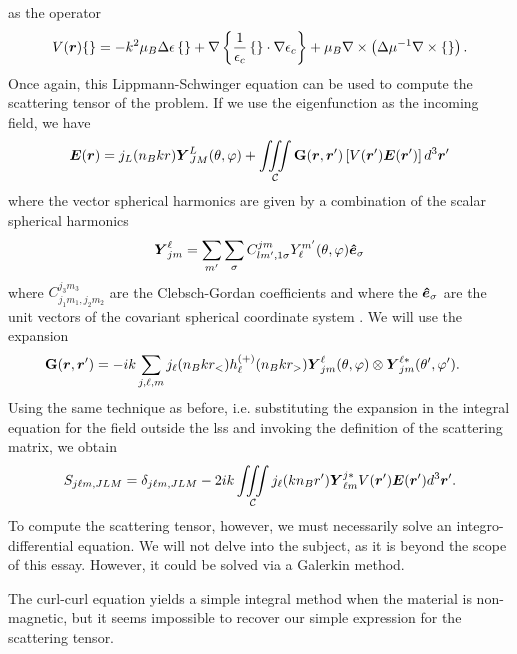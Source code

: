 as the operator
	\begin{equation}
		V(\boldsymbol{r})\{\} = -k^2\mu_B\Delta\epsilon\left\{\right\}
					+\nabla\left\{\frac{1}{\epsilon_c}\left\{\right\}\cdot\nabla\epsilon_c\right\}
					+\mu_B\nabla\times\left(\Delta\mu^{-1}\nabla\times\left\{\right\}\right).
	\end{equation}
Once again, this Lippmann-Schwinger equation can be used to compute the scattering tensor
of the problem. If we use the eigenfunction as the incoming field, we have
	\begin{equation}
		\boldsymbol{E}(\boldsymbol{r}) = j_L(n_Bkr)\boldsymbol{Y}^L_{JM}(\theta,\varphi)
						+\mathop{\iiint}_\mathcal{C}\mathbf{G}(\boldsymbol{r},\boldsymbol{r}')\left[V(\boldsymbol{r}')\boldsymbol{E}(\boldsymbol{r}')\right]d^3\boldsymbol{r}'
	\end{equation}
where the vector spherical harmonics are given by a combination of the
scalar spherical harmonics
	\begin{equation}
		\boldsymbol{Y}^\ell_{jm} = \sum_{m'}\sum_{\sigma}C^{jm}_{lm',1\sigma}Y_\ell^{m'}(\theta,\varphi)\boldsymbol{\hat{e}}_\sigma
	\end{equation}
where $C^{j_3m_3}_{j_1m_1,j_2m_2}$ are the Clebsch-Gordan coefficients and where
the $\boldsymbol{\hat{e}}_\sigma$ are the unit vectors of the covariant spherical coordinate system \cite{VAR1988}.
We will use the expansion
	\begin{align}
		\mathbf{G}(\boldsymbol{r},\boldsymbol{r}')	&= -ik\sum_{j,\ell,m} j_\ell(n_Bkr_<)h^{(+)}_\ell(n_Bkr_>)
													\boldsymbol{Y}^{\ell}_{jm}(\theta,\varphi)\otimes\boldsymbol{Y}^{\ell*}_{jm}(\theta',\varphi').
	\end{align}
Using the same technique as before, i.e. substituting the expansion in the integral equation
for the field outside the \gls{lss} and invoking the definition of the scattering matrix, 
we obtain
	\begin{equation}
		S_{j\ell m,JLM} = \delta_{j\ell m,JLM}
			-2ik\mathop{\iiint}_\mathcal{C}j_\ell(kn_Br')\boldsymbol{Y}^{j*}_{\ell m}V(\boldsymbol{r}')\boldsymbol{E}(\boldsymbol{r}')d^3\boldsymbol{r}'.
	\end{equation}
To compute the scattering tensor, however, we must necessarily solve an integro-differential equation.
We will not delve into the subject, as it is beyond the scope of this essay. However, 
it could be solved via a Galerkin method. 

The curl-curl equation yields a simple integral method when the material
is non-magnetic, but it seems impossible to recover our simple expression
for the scattering tensor.